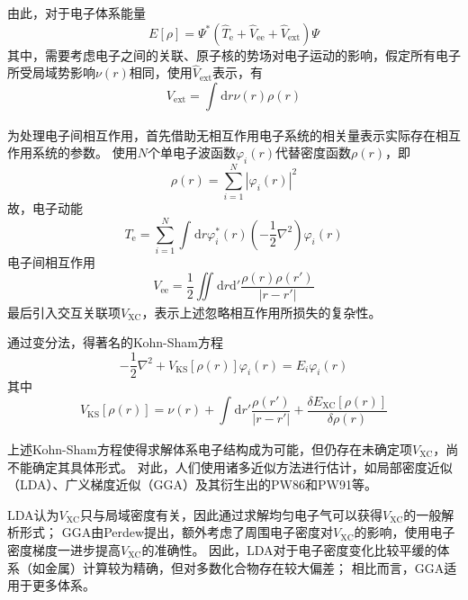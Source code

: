 由此，对于电子体系能量
\begin{equation}
    E[\rho] = \varPsi ^*(\hat{T}_{\mathrm{e}}+\hat{V}_{\mathrm{ee}}+\hat{V}_{\mathrm{ext}})\varPsi
\end{equation}
其中，需要考虑电子之间的关联、原子核的势场对电子运动的影响，假定所有电子所受局域势影响$\nu(r)$相同，使用$\hat{V}_{\mathrm{ext}}$表示，有
\begin{equation}
    V_{\mathrm{ext}} = \int_{}^{}\mathrm{d}r\nu(r)\rho(r)
\end{equation}

为处理电子间相互作用，首先借助无相互作用电子系统的相关量表示实际存在相互作用系统的参数。
使用$N$个单电子波函数$ \varphi _i(r) $代替密度函数$\rho(r)$，即
\begin{equation}
    \rho(r)=\sum_{i=1}^{N}|\varphi_i (r)|^2
\end{equation}
故，电子动能
\begin{equation}
    T_{\mathrm{e}}=\sum_{i=1}^{N}\int_{}^{}\mathrm{d}r\varphi^*_i(r)(-\frac{1}{2}\nabla^2)\varphi_i(r)
\end{equation}
电子间相互作用
\begin{equation}
    V_{\mathrm{ee}} =\frac{1}{2}\iint_{}^{}\mathrm{d}r\mathrm{d'}\frac{\rho(r)\rho(r')}{|r-r'|}
\end{equation}
最后引入交互关联项$V_{\mathrm{XC}}$，表示上述忽略相互作用所损失的复杂性。

通过变分法，得著名的Kohn-Sham方程
\begin{equation}
    {-\frac{1}{2}\nabla^2+V_{\mathrm{KS}}[\rho(r)]}\varphi_i(r)=E_i\varphi_i(r)
\end{equation}
其中
\begin{equation}
    V_{\mathrm{KS}}[\rho(r)]=\nu(r)+\int_{}^{}\mathrm{d}r'\frac{\rho(r')}{|r-r'|}+\frac{\delta E_{\mathrm{XC}}[\rho(r)]}{\delta\rho(r)}
\end{equation}

上述Kohn-Sham方程使得求解体系电子结构成为可能，但仍存在未确定项$V_{\mathrm{XC}}$，尚不能确定其具体形式。
对此，人们使用诸多近似方法进行估计，如局部密度近似（LDA）、广义梯度近似（GGA）及其衍生出的PW86和PW91等。

LDA认为$V_{\mathrm{XC}}$只与局域密度有关，因此通过求解均匀电子气可以获得$V_{\mathrm{XC}}$的一般解析形式；
GGA由Perdew提出，额外考虑了周围电子密度对$V_{\mathrm{XC}}$的影响，使用电子密度梯度一进步提高$V_{\mathrm{XC}}$的准确性。
因此，LDA对于电子密度变化比较平缓的体系（如金属）计算较为精确，但对多数化合物存在较大偏差；
相比而言，GGA适用于更多体系。

